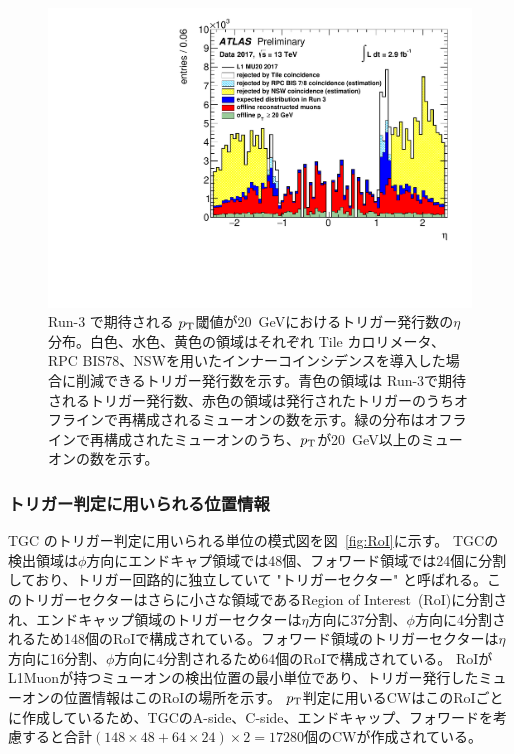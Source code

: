 \begin{figure}[tb]
  \centering
    \includegraphics[clip, width=14cm]{fig/3/ATL-COM-DAQ-2018-033-fig2.pdf}
  \caption{Run-3 で期待される $p_{\rm{T}}$閾値が20~GeVにおけるトリガー発行数の$\eta$分布。白色、水色、黄色の領域はそれぞれ Tile カロリメータ、RPC BIS78、NSWを用いたインナーコインシデンスを導入した場合に削減できるトリガー発行数を示す。青色の領域は Run-3で期待されるトリガー発行数、赤色の領域は発行されたトリガーのうちオフラインで再構成されるミューオンの数を示す。緑の分布はオフラインで再構成されたミューオンのうち、$p_{\rm{T}}$が20~GeV以上のミューオンの数を示す。}
  \label{fig:Rate_innercoincidence}
\end{figure}

\subsubsection{トリガー判定に用いられる位置情報}
TGC のトリガー判定に用いられる単位の模式図を図~\ref{fig:RoI}に示す。
TGCの検出領域は$\phi$方向にエンドキャプ領域では48個、フォワード領域では24個に分割しており、トリガー回路的に独立していて "トリガーセクター" と呼ばれる。このトリガーセクターはさらに小さな領域であるRegion of Interest~(RoI)に分割され、エンドキャップ領域のトリガーセクターは$\eta$方向に37分割、$\phi$方向に4分割されるため148個のRoIで構成されている。フォワード領域のトリガーセクターは$\eta$方向に16分割、$\phi$方向に4分割されるため64個のRoIで構成されている。
RoIがL1Muonが持つミューオンの検出位置の最小単位であり、トリガー発行したミューオンの位置情報はこのRoIの場所を示す。
$p_{\rm{T}}$判定に用いるCWはこのRoIごとに作成しているため、TGCのA-side、C-side、エンドキャップ、フォワードを考慮すると合計$(148\times48+64\times24)\times2=17280$個のCWが作成されている。

